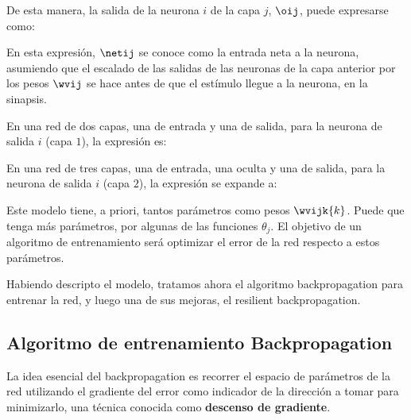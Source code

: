 De esta manera, la salida de la neurona $i$ de la capa $j$, $\oij$, puede expresarse como:


En esta expresión, $\netij$ se conoce como la entrada neta a la neurona, asumiendo que el escalado de las salidas de las neuronas de la capa anterior por los pesos $\wvij$ se hace antes de que el estímulo llegue a la neurona, en la sinapsis. 

En una red de dos capas, una de entrada y una de salida, para la neurona de salida $i$ (capa $1$), la expresión es:


En una red de tres capas, una de entrada, una oculta y una de salida, para la neurona de salida $i$ (capa $2$), la expresión se expande a:


Este modelo tiene, a priori, tantos parámetros como pesos $\wvijk{k}$. Puede que tenga más parámetros, por algunas de las funciones $\theta_j$. El objetivo de un algoritmo de entrenamiento será optimizar el error de la red respecto a estos parámetros.

Habiendo descripto el modelo, tratamos ahora el algoritmo backpropagation para entrenar la red, y luego una de sus mejoras, el resilient backpropagation.

\subsection{Algoritmo de entrenamiento Backpropagation}


La idea esencial del backpropagation es recorrer el espacio de parámetros de la red utilizando el gradiente del error como indicador de la dirección a tomar para minimizarlo, una técnica conocida como \textbf{descenso de gradiente}.



